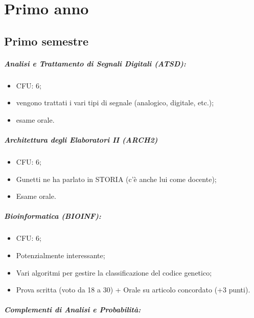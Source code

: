 \chapter{Primo anno}

\section{Primo semestre}  

\paragraph{Analisi e Trattamento di Segnali Digitali (ATSD):}

\begin{itemize}
  \item CFU: 6;
  \item vengono trattati i vari tipi di segnale (analogico, digitale, etc.);
  \item esame orale.
\end{itemize}

\paragraph{Architettura degli Elaboratori II (ARCH2)}

\begin{itemize}
  \item CFU: 6;
  \item Gunetti ne ha parlato in STORIA (c'è anche lui come docente);
  \item Esame orale.
\end{itemize}

\paragraph{Bioinformatica (BIOINF):}

\begin{itemize}
  \item CFU: 6;
  \item Potenzialmente interessante;
  \item Vari algoritmi per gestire la classificazione del codice genetico;
  \item Prova scritta (voto da 18 a 30) + Orale su articolo concordato (+3 punti).
\end{itemize}

\paragraph{Complementi di Analisi e Probabilità:}

